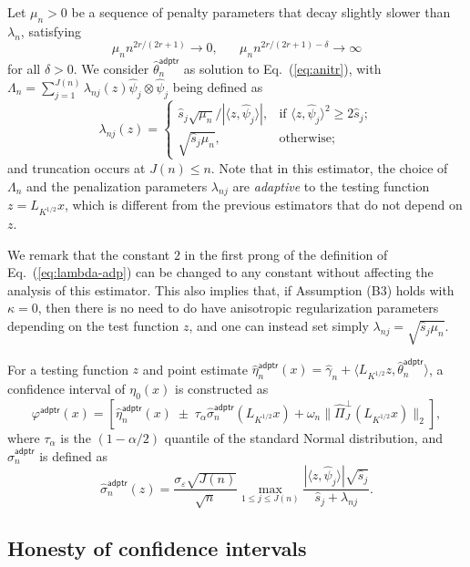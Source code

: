 \documentclass[11pt,a4paper]{article}
\renewcommand{\hat}{\widehat}
\theoremstyle{definition}
\theoremstyle{plain}
\theoremstyle{remark}
\newcommand{\adptr}{\mathsf{adptr}}
\begin{document}
Let $\mu_n>0$ be a sequence of penalty parameters that decay slightly slower than $\lambda_n$, satisfying
\begin{equation}
\mu_n n^{2r/(2r+1)}\to 0,\;\;\;\;\;\;\mu_n n^{2r/(2r+1)-\delta}\to\infty
\label{eq:mun}
\end{equation}
for all $\delta>0$.
We consider $\hat\theta_n^\adptr$ as solution to Eq.~(\ref{eq:anitr}), with $\Lambda_n=\sum_{j=1}^{J(n)}\lambda_{nj}(z)\hat\psi_j\otimes\hat\psi_j$ being defined as
\begin{equation}
\lambda_{nj}(z) = \left\{\begin{array}{ll}\hat s_j\sqrt{\mu_n}/|\langle z,\hat\psi_j\rangle|,&\text{if } \langle z,\hat\psi_j\rangle^2\geq 2\hat s_j;\\ \sqrt{\hat s_j\mu_n},& \text{otherwise};\end{array}\right.
\label{eq:lambda-adp}
\end{equation}
and truncation occurs at $J(n)\leq n$.
Note that in this estimator, the choice of $\Lambda_n$ and the penalization parameters $\lambda_{nj}$ are \emph{adaptive} to the testing function $z=L_{K^{1/2}}x$,
which is different from the previous estimators that do not depend on $z$.

We remark that the constant $2$ in the first prong of the definition of Eq.~(\ref{eq:lambda-adp}) can be changed to any constant without affecting the analysis of this estimator.
This also implies that, if Assumption (B3) holds with $\kappa=0$, then there is no need to do have anisotropic regularization parameters depending on
the test function $z$, and one can instead set simply $\lambda_{nj}= \sqrt{\hat s_j\mu_n}$.

For a testing function $z$ and point estimate $\hat\eta_n^\adptr(x)=\hat\gamma_n+\langle L_{K^{1/2}}z,\hat\theta_n^\adptr\rangle$, a confidence interval of $\eta_0(x)$ is constructed as
$$
\varphi^\adptr(x) = [\hat\eta_n^\adptr(x)\;\pm\;\tau_{\alpha}\hat\sigma_n^\adptr(L_{K^{1/2}}x)+\omega_n\|\hat\Pi_J^\perp(L_{K^{1/2}}x)\|_2],
$$
where $\tau_{\alpha}$ is the $(1-\alpha/2)$ quantile of the standard Normal distribution, and $\hat\sigma_n^\adptr$ is defined as
$$
\hat\sigma_n^\adptr(z) = \frac{\sigma_\varepsilon\sqrt{J(n)}}{\sqrt{n}}\max_{1\leq j\leq J(n)}\frac{|\langle z,\hat\psi_j\rangle|\sqrt{\hat s_j}}{\hat s_j+\lambda_{nj}}.
$$

\subsection{Honesty of confidence intervals}
\end{document}
